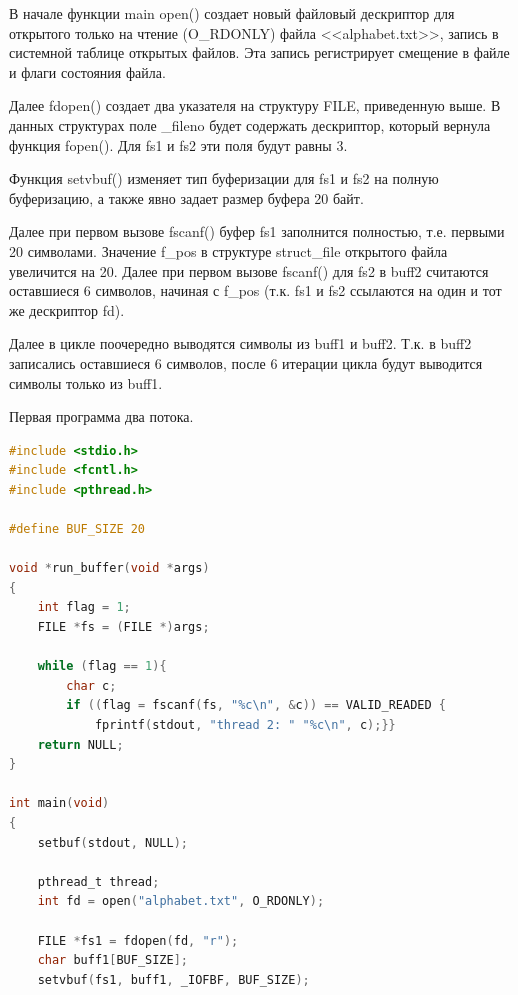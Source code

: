 \documentclass[a4paper,oneside,12pt]{extreport}
\begin{document}
\begin{task}
    В начале функции main open() создает новый файловый дескриптор для открытого
    только на чтение (O\_RDONLY) файла <<alphabet.txt>>, запись в системной таблице открытых файлов. 
    Эта запись регистрирует смещение в файле и флаги состояния файла.
    
    Далее fdopen() создает два указателя на структуру FILE, приведенную выше.
    В данных структурах поле \_fileno будет содержать дескриптор, который вернула
    функция fopen(). Для fs1 и fs2 эти поля будут равны 3.

    Функция setvbuf() изменяет тип буферизации для fs1 и fs2 на
    полную буферизацию, а также явно задает размер буфера 20 байт.

    Далее при первом вызове fscanf() буфер fs1 заполнится полностью, 
    т.е. первыми 20 символами. 
    Значение f\_pos в структуре struct\_file открытого файла увеличится на 20.
    Далее при первом вызове fscanf() для fs2 в buff2 считаются оставшиеся 6 символов,
    начиная с f\_pos (т.к. fs1 и fs2 ссылаются на один и тот же дескриптор fd).

    Далее в цикле поочередно выводятся символы из buff1 и buff2.
    Т.к. в buff2 записались оставшиеся 6 символов, после 6 итерации
    цикла будут выводится символы только из buff1.

    \begin{figure}[ht!]
    \end{figure}

Первая программа два потока.
    \begin{lstlisting}[language=C]
#include <stdio.h>
#include <fcntl.h>
#include <pthread.h>

#define BUF_SIZE 20

void *run_buffer(void *args)
{
	int flag = 1;
	FILE *fs = (FILE *)args;
	
	while (flag == 1){
		char c;
		if ((flag = fscanf(fs, "%c\n", &c)) == VALID_READED	{
			fprintf(stdout, "thread 2: " "%c\n", c);}}
	return NULL;
}

int main(void)
{
	setbuf(stdout, NULL);
	
	pthread_t thread;
	int fd = open("alphabet.txt", O_RDONLY); 
	
	FILE *fs1 = fdopen(fd, "r");
	char buff1[BUF_SIZE];
	setvbuf(fs1, buff1, _IOFBF, BUF_SIZE); 
	

\end{lstlisting}
\end{task}
\end{document}
